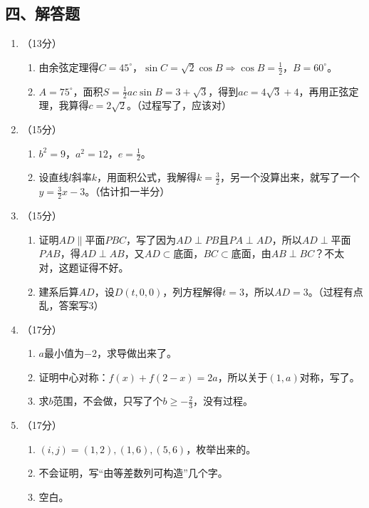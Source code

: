 \documentclass[12pt,a4paper]{article}
\begin{document}
\begin{enumerate}[label=\arabic*.]
\section*{四、解答题}
\begin{enumerate}[label=\arabic*.]
\item （13分）
\begin{enumerate}[label=(\arabic*)]
\item 由余弦定理得$C=45^\circ$，$\sin C=\sqrt2\cos B\Rightarrow \cos B=\frac12$，$B=60^\circ$。
\item $A=75^\circ$，面积$S=\frac12 ac\sin B=3+\sqrt3$，得到$ac=4\sqrt3+4$，再用正弦定理，我算得$c=2\sqrt2$。（过程写了，应该对）
\end{enumerate}

\item （15分）
\begin{enumerate}[label=(\arabic*)]
\item $b^2=9$，$a^2=12$，$e=\frac12$。
\item 设直线$l$斜率$k$，用面积公式，我解得$k=\frac32$，另一个没算出来，就写了一个$y=\frac32x-3$。（估计扣一半分）
\end{enumerate}

\item （15分）
\begin{enumerate}[label=(\arabic*)]
\item 证明$AD\parallel$平面$PBC$，写了因为$AD\perp PB$且$PA\perp AD$，所以$AD\perp$平面$PAB$，得$AD\perp AB$，又$AD\subset$底面，$BC\subset$底面，由$AB\perp BC$？不太对，这题证得不好。
\item 建系后算$AD$，设$D(t,0,0)$，列方程解得$t=3$，所以$AD=3$。（过程有点乱，答案写3）
\end{enumerate}

\item （17分）
\begin{enumerate}[label=(\arabic*)]
\item $a$最小值为$-2$，求导做出来了。
\item 证明中心对称：$f(x)+f(2-x)=2a$，所以关于$(1,a)$对称，写了。
\item 求$b$范围，不会做，只写了个$b\ge -\frac23$，没有过程。
\end{enumerate}

\item （17分）
\begin{enumerate}[label=(\arabic*)]
\item $(i,j)=(1,2),(1,6),(5,6)$，枚举出来的。
\item 不会证明，写“由等差数列可构造”几个字。
\item 空白。
\end{enumerate}


\end{enumerate}
\end{enumerate}
\end{document}
